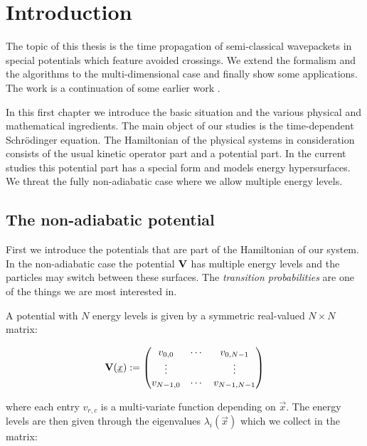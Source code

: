\chapter{Introduction}
\label{ch:introduction}


The topic of this thesis is the time propagation of semi-classical wavepackets
in special potentials which feature avoided crossings. We extend the formalism
and the algorithms to the multi-dimensional case and finally show some applications.
The work is a continuation of some earlier work \cite{FGL_semiclassical_dynamics, B_bachelor_thesis}.

In this first chapter we introduce the basic situation and the various physical
and mathematical ingredients. The main object of our studies is the time-dependent
Schrödinger equation. The Hamiltonian of the physical systems in consideration
consists of the usual kinetic operator part and a potential part. In the current
studies this potential part has a special form and models energy hypersurfaces.
We threat the fully non-adiabatic case where we allow multiple energy levels.


\section{The non-adiabatic potential}


First we introduce the potentials that are part of the Hamiltonian of our system.
In the non-adiabatic case the potential $\mathbf{V}$ has multiple energy levels
and the particles may switch between these surfaces. The \emph{transition probabilities}
are one of the things we are most interested in.

A potential with $N$ energy levels is given by a symmetric real-valued $N \times N$
matrix:

\begin{equation} \label{eq:potential_matrix}
  \mathbf{V}(\underline{x}) :=
  \begin{pmatrix}
    v_{0,0}   & \cdots & v_{0, N-1} \\
    \vdots    & {}     & \vdots \\
    v_{N-1,0} & \cdots & v_{N-1, N-1}
  \end{pmatrix}
\end{equation}

where each entry $v_{r,c}$ is a multi-variate function depending on $\vec{x}$.
The energy levels are then given through the eigenvalues $\lambda_i(\vec{x})$
which we collect in the matrix:


